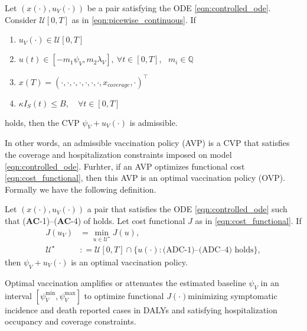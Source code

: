 \begin{definition}
    \label{dfn:admisible_policy}
    Let $(x(\cdot), u_V(\cdot))$ be a pair satisfying the ODE
    \eqref{eqn:controlled_ode}. Consider $\mathcal{U}[0, T]$
    as in \eqref{eqn:picewise_continuous}. If
    \begin{enumerate}[({\textbf{AC}}-1)]
        \item
            $u_V(\cdot) \in \mathcal{U} [0, T]$
        \item
            $u(t)\in [-m_1 \psi_V, m_2 \lambda_{V}],\ \forall t\in [0, T]$,
            \ $m_i \in \mathbb{Q}$
        \item
            $
            x(T) = (\cdot, \cdot, \cdot, 
                    \cdot, \cdot, \cdot,  
                    \cdot,  x_{coverage}, \cdot)^{\top}
            $
        \item
            $
                \kappa I_S(t) \leq B, \quad \forall t \in [0, T]
            $
    \end{enumerate}
    holds, then the CVP $\psi_V + u_V (\cdot)$ is
    admissible.
\end{definition}
In other words, an admissible vaccination policy (AVP) is a CVP that 
satisfies the coverage and hospitalization constraints imposed on
model \eqref{eqn:controlled_ode}. Furhter,
if an AVP optimizes functional cost \eqref{eqn:cost_functional}, then this AVP is an optimal vaccination policy (OVP). Formally we have the following definition.
\begin{definition}
    Let $(x(\cdot), u_V(\cdot))$ a pair that satisfies the ODE 
    \eqref{eqn:controlled_ode} such that (\textbf{AC}-1)--(\textbf{AC}-4) of 
     holds. Let cost functional $J$ as in 
    \eqref{eqn:cost_functional}. If
    \begin{equation}
        \begin{aligned}
            J(u_V) &=
                \min_{u  \in \mathcal{U}^{\star}}
                     J(u),
            \\
            \mathcal{U}^{\star} &: =
                \mathcal{U}[0, T]
                \cap\{
                    u(\cdot): \text{(ADC-1)--(ADC--4) holds}
                \},
        \end{aligned}
    \end{equation}
    then  $\psi_V + u_V(\cdot)$ is an optimal vaccination policy.
\end{definition}
\begin{rmk}
    Optimal vaccination amplifies or attenuates the estimated
    baseline $\psi_V$ in an interval $[\psi_V^{\min}, \psi_V^{\max}]$
    to optimize functional $J(\cdot)$\textemdash minimizing  symptomatic incidence and death reported cases in DALYs and satisfying hospitalization occupancy and coverage constraints.
\end{rmk}
    

